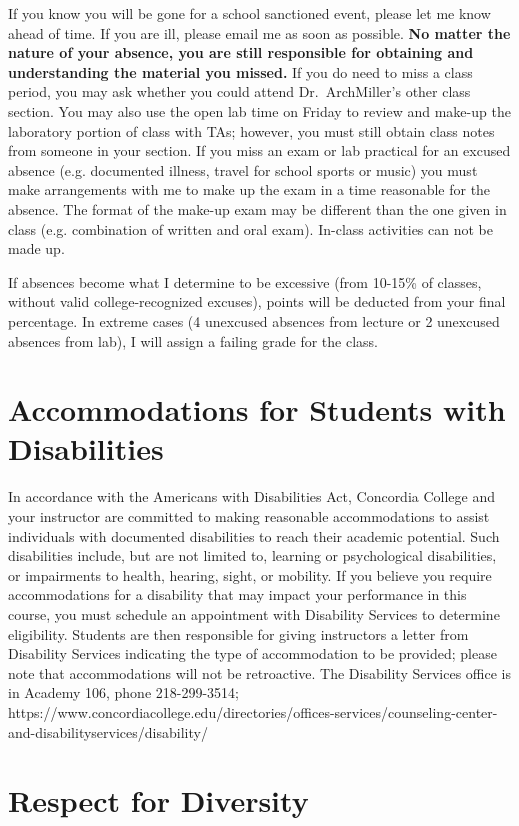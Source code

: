 \documentclass{tufte-handout}
\begin{document}
\begin{fullwidth}
If you know you will be gone for a school sanctioned event, please let me know ahead of time. If you are ill, please email me as soon as possible. \textbf{No matter the nature of your absence, you are still responsible for obtaining and understanding the material you missed.} If you do need to miss a class period, you may ask whether you could attend Dr.\ ArchMiller's other class section. You may also use the open lab time on Friday to review and make-up the laboratory portion of class with TAs; however, you must still obtain class notes from someone in your section.  If you miss an exam or lab practical for an excused absence (e.g. documented illness, travel for school sports or music) you must make arrangements with me to make up the exam in a time reasonable for the absence. The format of the make-up exam may be different than the one given in class (e.g. combination of written and oral exam). In-class activities can not be made up.

If absences become what I determine to be excessive (from 10-15\% of classes, without valid college-recognized excuses), points will be deducted from your final percentage. In extreme cases (4 unexcused absences from lecture or 2 unexcused absences from lab), I will assign a failing grade for the class. 

\section{Accommodations for Students with Disabilities}

In accordance with the Americans with Disabilities Act, Concordia College and your instructor are committed to making reasonable accommodations to assist individuals with documented disabilities to reach their academic potential. Such disabilities include, but are not limited to, learning or psychological disabilities, or impairments to health, hearing, sight, or mobility. If you believe you require accommodations for a disability that may impact your performance in this course, you must schedule an appointment with Disability Services to determine eligibility. Students are then responsible for giving instructors a letter from Disability Services indicating the type of accommodation to be provided; please note that accommodations will not be retroactive. The Disability Services office is in Academy 106, phone 218-299-3514; https://www.concordiacollege.edu/directories/offices-services/counseling-center-and-disabilityservices/disability/ 

\section{Respect for Diversity}


\end{fullwidth}
\end{document}
